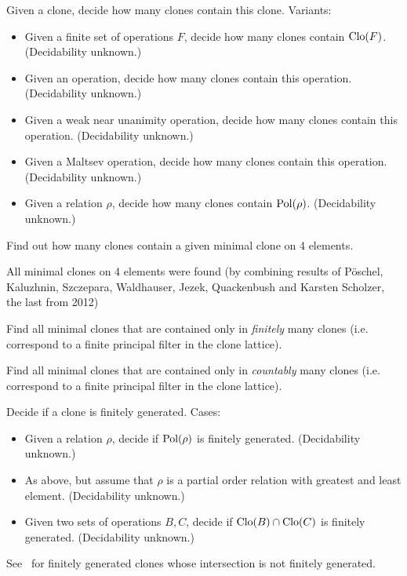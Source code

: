 \begin{question}
  Given a clone, decide how many clones contain this clone. Variants:
\begin{itemize}
    \item Given a finite set of operations $F$, decide how many clones contain
      $\operatorname{Clo}(F)$. (Decidability unknown.)
    \item Given an operation, decide how many clones contain this operation.
      (Decidability unknown.)
    \item Given a weak near unanimity operation, decide how many clones contain this operation.
      (Decidability unknown.)
    \item Given a Maltsev operation, decide how many clones contain this operation.
      (Decidability unknown.)
    \item Given a relation $\rho$, decide how many clones contain $\operatorname{Pol}(\rho)$.
      (Decidability unknown.)
  \end{itemize}
\end{question}

\begin{question}
  Find out how many clones contain a given minimal clone on 4 elements.
\end{question}
\begin{context}
All minimal clones on 4 elements were found (by combining results of 
P\"oschel, Kaluzhnin, Szczepara, Waldhauser, Jezek, Quackenbush and Karsten
Scholzer, the last from 2012)
\end{context}
\begin{question}
  Find all minimal clones that are contained only in \emph{finitely} many clones (i.e.
  correspond to a finite principal filter in the clone lattice).
\end{question}

\begin{question}
  Find all minimal clones that are contained only in \emph{countably} many clones (i.e.
  correspond to a finite principal filter in the clone lattice).
\end{question}

\begin{question}
  Decide if a clone is finitely generated. Cases:
  \begin{itemize}
    \item Given a relation $\rho$, decide if $\operatorname{Pol}(\rho)$ is finitely
      generated. (Decidability unknown.)
    \item As above, but assume that $\rho$ is a partial order relation with
      greatest and least element. (Decidability unknown.)
    \item Given two sets of operations $B, C$, decide if $\operatorname{Clo}(B)\cap \operatorname{Clo}(C)$
      is finitely generated. (Decidability unknown.)
  \end{itemize}
\end{question}
\begin{context}
  See~\cite{haddad} for finitely generated clones whose intersection is not
  finitely generated.
\end{context}

